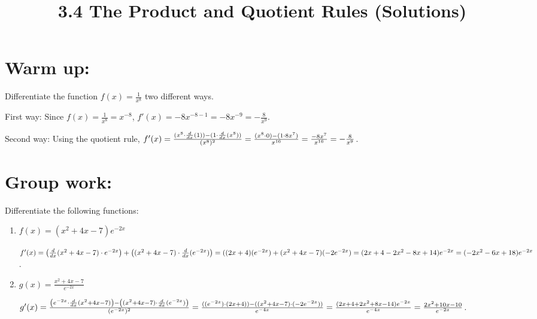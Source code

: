 \documentclass[nooutcomes]{ximera}
\title{3.4 The Product and Quotient Rules (Solutions)}
\begin{document}
\begin{abstract}		\end{abstract}
\maketitle

\section*{Warm up:} 
Differentiate the function $f(x) = \frac{1}{x^8}$ two different ways.

	\begin{freeResponse}
	First way:  Since $f(x) = \frac{1}{x^8} = x^{-8}$, $f'(x) = -8x^{-8-1} = -8x^{-9} = -\frac{8}{x^9}$.
	
	Second way:  Using the quotient rule, 
	$f'(x) = \frac{(x^8 \cdot \frac{d}{dx}(1)) - (1 \cdot \frac{d}{dx}(x^8))}{(x^8)^2}
	= \frac{(x^8 \cdot 0) - (1 \cdot 8x^7)}{x^{16}}
	= \frac{-8x^7}{x^{16}}
	= - \frac{8}{x^9}$.
	\end{freeResponse}	
	
	
	
	
	

\section*{Group work:}

\begin{problem}
Differentiate the following functions:

	\begin{enumerate}
	
	\item  $f(x) = (x^2 + 4x - 7) e^{-2x}$
			\begin{freeResponse}
			$f'(x) = \left( \frac{d}{dx}(x^2 + 4x - 7) \cdot e^{-2x} \right) + \left((x^2 + 4x - 7) \cdot \frac{d}{dx}(e^{-2x}) \right)
			= ((2x+4)(e^{-2x}) + (x^2 + 4x - 7)(-2e^{-2x})
			= (2x + 4 - 2x^2 - 8x + 14)e^{-2x}
			= (-2x^2 - 6x + 18)e^{-2x}$.
			\end{freeResponse}
			
			
			
	\item  $g(x) = \frac{x^2 + 4x - 7}{e^{-2x}}$
			\begin{freeResponse}
			$g'(x) = \frac{\left( e^{-2x} \cdot \frac{d}{dx}(x^2 + 4x - 7) \right) - \left( (x^2 + 4x - 7) \cdot \frac{d}{dx}(e^{-2x}) \right)}{(e^{-2x})^2}
			= \frac{((e^{-2x}) \cdot (2x+4)) - ((x^2 + 4x - 7) \cdot (-2e^{-2x}))}{e^{-4x}}
			= \frac{(2x + 4 + 2x^2 + 8x - 14)e^{-2x}}{e^{-4x}}
			= \frac{2x^2 + 10x - 10}{e^{-2x}}$.
			\end{freeResponse}
			
			
			
			
	\end{enumerate}		
\end{problem}
	
\end{document}
